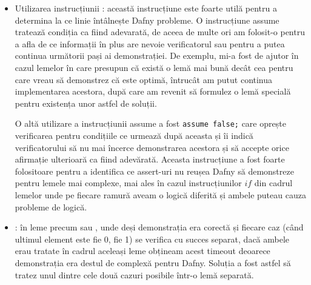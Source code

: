 \begin{sloppypar}
\begin{itemize}
    \hspace{2mm} De asemenea, folosind structura \texttt{assert ... by} putem reduce sarcina verificatorului deoarece pașii din acest bloc de instrucțiuni sunt uitați după verificarea condiției din assert:
    \begin{Verbatim}[commandchars=\\\{\}]
\PY{k}{assert} \PY{n}{gain}\PY{p}{(}\PY{n}{p}\PY{p}{,} \PY{n}{x}\PY{p}{[}\PY{p}{..}\PY{n}{i} \PY{o}{\PYZhy{}} \PY{l+m+mi}{1}\PY{p}{]}\PY{p}{)} \PY{o}{==} \PY{n}{gain}\PY{p}{(}\PY{n}{p}\PY{p}{,} \PY{n}{solution1}\PY{p}{)} \PY{n}{by}
\PY{p}{\PYZob{}}
  \PY{n}{optimalSolRemove1}\PY{p}{(}\PY{n}{p}\PY{p}{,} \PY{n}{x}\PY{p}{,} \PY{n}{i}\PY{p}{,} \PY{n}{j}\PY{p}{)}\PY{p}{;}
  \PY{k}{assert} \PY{n}{isOptimalPartialSolution}\PY{p}{(}\PY{n}{p}\PY{p}{,} \PY{n}{x}\PY{p}{[}\PY{p}{..}\PY{n}{i} \PY{o}{\PYZhy{}} \PY{l+m+mi}{1}\PY{p}{]}\PY{p}{,} 
    \PY{n}{i} \PY{o}{\PYZhy{}} \PY{l+m+mi}{1}\PY{p}{,} \PY{n}{j} \PY{o}{\PYZhy{}} \PY{n}{p}\PY{p}{.}\PY{n}{weights}\PY{p}{[}\PY{n}{i} \PY{o}{\PYZhy{}} \PY{l+m+mi}{1}\PY{p}{]}\PY{p}{)}\PY{p}{;}
\PY{p}{\PYZcb{}} 
\end{Verbatim}
    \item Utilizarea instrucțiunii : această instrucțiune este foarte utilă pentru a determina la ce linie întâlnește Dafny probleme. O instrucțiune assume tratează condiția ca fiind adevarată, de aceea de multe ori am folosit-o pentru a afla de ce informații în plus are nevoie verificatorul sau pentru a putea continua următorii pași ai demonstrației. De exemplu, mi-a fost de ajutor în cazul lemelor în care presupun că există o lemă mai bună decât cea pentru care vreau să demonstrez că este optimă, întrucât am putut continua implementarea acestora, după care am revenit să formulez o lemă specială pentru existența unor astfel de soluții. \par
    \hspace{2mm} O altă utilizare a instrucțiunii assume a fost \texttt{assume false;} care oprește verificarea pentru condițiile ce urmează după aceasta și îi indică verificatorului să nu mai încerce demonstrarea acestora și să accepte orice afirmație ulterioară ca fiind adevărată. Aceasta instrucțiune a fost foarte folositoare pentru a identifica ce assert-uri nu reușea Dafny să demonstreze pentru lemele mai complexe, mai ales în cazul instrucțiunilor $if$ din cadrul lemelor unde pe fiecare ramură aveam o logică diferită și ambele puteau cauza probleme de logică.
    \item {}: în leme precum  sau , unde deși demonstrația era corectă și fiecare caz (când ultimul element este fie 0, fie 1) se verifica cu succes separat, dacă ambele erau tratate în cadrul aceleași leme obțineam acest timeout deoarece demonstrația era destul de complexă pentru Dafny. Soluția a fost astfel să tratez unul dintre cele două cazuri posibile într-o lemă separată.
\end{itemize}
\end{sloppypar}